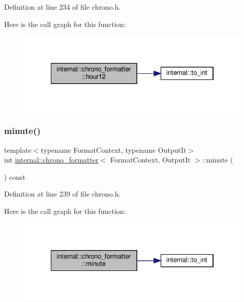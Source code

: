 Definition at line 234 of file chrono.\+h.

Here is the call graph for this function\+:
\nopagebreak
\begin{figure}[H]
\begin{center}
\leavevmode
\includegraphics[width=322pt]{structinternal_1_1chrono__formatter_a93a043750e6942332112e7210c517804_cgraph}
\end{center}
\end{figure}
\mbox{\label{structinternal_1_1chrono__formatter_ad177f1fef4a92b6a96957ecd6c9dcf16}} 
\subsubsection{\texorpdfstring{minute()}{minute()}}
{\footnotesize\ttfamily template$<$typename Format\+Context, typename Output\+It$>$ \\
int \hyperlink{structinternal_1_1chrono__formatter}{internal\+::chrono\+\_\+formatter}$<$ Format\+Context, Output\+It $>$\+::minute (\begin{DoxyParamCaption}{ }\end{DoxyParamCaption}) const\hspace{0.3cm}{\ttfamily [inline]}}



Definition at line 239 of file chrono.\+h.

Here is the call graph for this function\+:
\nopagebreak
\begin{figure}[H]
\begin{center}
\leavevmode
\includegraphics[width=322pt]{structinternal_1_1chrono__formatter_ad177f1fef4a92b6a96957ecd6c9dcf16_cgraph}
\end{center}
\end{figure}
\mbox{\label{structinternal_1_1chrono__formatter_a6b6521428a41d5f6db9c54f6afd993e2}} 
